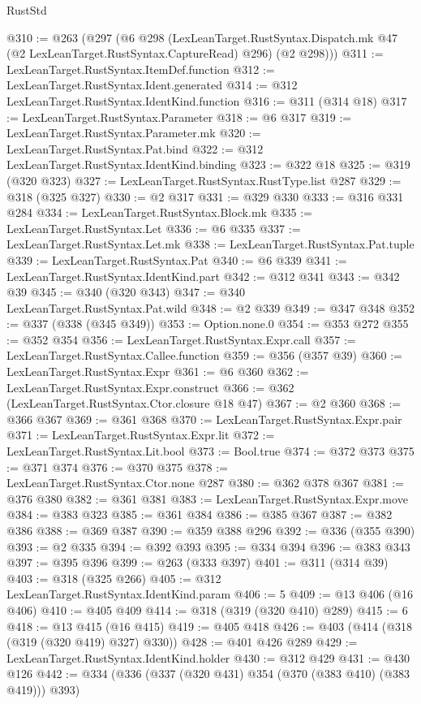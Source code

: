 \begin{lexlean}{RustStd}
\begin{coremodule}
{\begin{coremodule}
{{{{{{{{{@310 := @263
    (@297
      (@6
        @298
        (LexLeanTarget.RustSyntax.Dispatch.mk @47 (@2 LexLeanTarget.RustSyntax.CaptureRead) @296)
        (@2 @298)))
@311 := LexLeanTarget.RustSyntax.ItemDef.function
@312 := LexLeanTarget.RustSyntax.Ident.generated
@314 := @312 LexLeanTarget.RustSyntax.IdentKind.function
@316 := @311 (@314 @18)
@317 := LexLeanTarget.RustSyntax.Parameter
@318 := @6 @317
@319 := LexLeanTarget.RustSyntax.Parameter.mk
@320 := LexLeanTarget.RustSyntax.Pat.bind
@322 := @312 LexLeanTarget.RustSyntax.IdentKind.binding
@323 := @322 @18
@325 := @319 (@320 @323)
@327 := LexLeanTarget.RustSyntax.RustType.list @287
@329 := @318 (@325 @327)
@330 := @2 @317
@331 := @329 @330
@333 := @316 @331 @284
@334 := LexLeanTarget.RustSyntax.Block.mk
@335 := LexLeanTarget.RustSyntax.Let
@336 := @6 @335
@337 := LexLeanTarget.RustSyntax.Let.mk
@338 := LexLeanTarget.RustSyntax.Pat.tuple
@339 := LexLeanTarget.RustSyntax.Pat
@340 := @6 @339
@341 := LexLeanTarget.RustSyntax.IdentKind.part
@342 := @312 @341
@343 := @342 @39
@345 := @340 (@320 @343)
@347 := @340 LexLeanTarget.RustSyntax.Pat.wild
@348 := @2 @339
@349 := @347 @348
@352 := @337 (@338 (@345 @349))
@353 := Option.none.{0}
@354 := @353 @272
@355 := @352 @354
@356 := LexLeanTarget.RustSyntax.Expr.call
@357 := LexLeanTarget.RustSyntax.Callee.function
@359 := @356 (@357 @39)
@360 := LexLeanTarget.RustSyntax.Expr
@361 := @6 @360
@362 := LexLeanTarget.RustSyntax.Expr.construct
@366 := @362 (LexLeanTarget.RustSyntax.Ctor.closure @18 @47)
@367 := @2 @360
@368 := @366 @367
@369 := @361 @368
@370 := LexLeanTarget.RustSyntax.Expr.pair
@371 := LexLeanTarget.RustSyntax.Expr.lit
@372 := LexLeanTarget.RustSyntax.Lit.bool
@373 := Bool.true
@374 := @372 @373
@375 := @371 @374
@376 := @370 @375
@378 := LexLeanTarget.RustSyntax.Ctor.none @287
@380 := @362 @378 @367
@381 := @376 @380
@382 := @361 @381
@383 := LexLeanTarget.RustSyntax.Expr.move
@384 := @383 @323
@385 := @361 @384
@386 := @385 @367
@387 := @382 @386
@388 := @369 @387
@390 := @359 @388 @296
@392 := @336 (@355 @390)
@393 := @2 @335
@394 := @392 @393
@395 := @334 @394
@396 := @383 @343
@397 := @395 @396
@399 := @263 (@333 @397)
@401 := @311 (@314 @39)
@403 := @318 (@325 @266)
@405 := @312 LexLeanTarget.RustSyntax.IdentKind.param
@406 := 5
@409 := @13 @406 (@16 @406)
@410 := @405 @409
@414 := @318 (@319 (@320 @410) @289)
@415 := 6
@418 := @13 @415 (@16 @415)
@419 := @405 @418
@426 := @403 (@414 (@318 (@319 (@320 @419) @327) @330))
@428 := @401 @426 @289
@429 := LexLeanTarget.RustSyntax.IdentKind.holder
@430 := @312 @429
@431 := @430 @126
@442 := @334 (@336 (@337 (@320 @431) @354 (@370 (@383 @410) (@383 @419))) @393)
}}}}}}}}}
\end{coremodule}}
\end{coremodule}
\end{lexlean}
